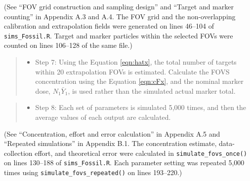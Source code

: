 \documentclass[
  12pt,
]{article}
\providecommand{\tightlist}{%
  \setlength{\itemsep}{0pt}\setlength{\parskip}{0pt}}
\begin{document}
(See ``FOV grid construction and sampling design'' and ``Target and
marker counting'' in Appendix A.3 and A.4. The FOV grid and the
non-overlapping calibration and extrapolation fields were generated on
lines 46--104 of \texttt{sims\_Fossil.R}. Target and marker particles
within the selected FOVs were counted on lines 106--128 of the same
file.)

\begin{quote}
\begin{itemize}
\tightlist
\item
  Step 7: Using the Equation \eqref{eqn:hatx}, the total number of
  targets within 20 extrapolation FOVs is estimated. Calculate the FOVS
  concentration using the Equation \eqref{eqn:cFx}, and the nominal
  marker dose, \(N_1\bar{Y}_1\), is used rather than the simulated
  actual marker total.
\end{itemize}
\end{quote}

\begin{quote}
\begin{itemize}
\tightlist
\item
  Step 8: Each set of parameters is simulated 5,000 times, and then the
  average values of each output are calculated.
\end{itemize}
\end{quote}

(See ``Concentration, effort and error calculation'' in Appendix A.5 and
``Repeated simulations'' in Appendix B.1. The concentration estimate,
data-collection effort, and theoretical error were calculated in
\texttt{simulate\_fovs\_once()} on lines 130--188 of
\texttt{sims\_Fossil.R}. Each parameter setting was repeated 5,000 times
using \texttt{simulate\_fovs\_repeated()} on lines 193--220.)
\end{document}
